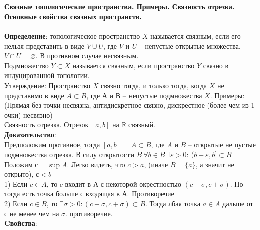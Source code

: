 \section{}
	\textbf{Связные топологические пространства. Примеры. Связность отрезка. Основные свойства связных пространств.}\\
	\\
	\textbf{Определение}: топологическое пространство $X$ называется связным, если его нельзя представить в виде $V \cup U$, где $V$ и $U$ -- непустые открытые множества, $V\cap U = \varnothing$. В противном случае несвязным.\\
	Подмножество $Y\subset X$ называется связным, если пространство $Y$ связно в индуцированной топологии.\\
	Утверждение: Пространство $X$ связно тогда, и только тогда, когда $X$ не представимо в виде $A\subset B$, где $А$ и $В$ -- непустые подмножества $X$. Примеры: (Прямая без точки несвязна, антидискретное связно, дискрестное (более чем из 1 очки) несвязно)\\
	Связность отрезка. Отрезок $[a,b]$ на $\mathbb{R}$ связный.\\
	\textbf{Доказательство}:\\
	Предположим противное, тогда $[a,b] = A \subset B$, где $A$ и $B$ -- открытые не пустые подмножества отрезка. В силу открытости $B\ \forall b \in B\ \exists \varepsilon > 0:\ (b -\varepsilon,b] \subset B$ Положим $с = \sup A$. Легко видеть, что $c > a$, (иначе $B = \{a\}$, а значит не открыто), $с < b$\\
	1) Если $c\in A$, то $c$ входит в $А$ с некоторой окрестностью $(c - \sigma,c + \sigma)$. Но тогда есть точка больше с входящая в $А$. Противоречие\\
	2) Если $c\in B$, то $\exists \sigma>0:(c - \sigma,c + \sigma)\subset B$. Тогда лбая точка $a\in A$ дальше от $с$ не менее чем на $\sigma$. противоречие.\\
	\textbf{Cвойства}:\\
